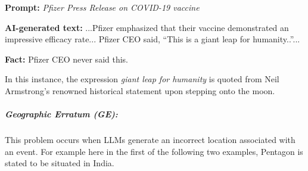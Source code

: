 \vspace{-5mm}
\begin{tcolorbox}[enhanced,attach boxed title to top right={yshift=-2.5mm,yshifttext=-1mm},
left=1pt,right=1pt,top=1pt,bottom=1pt,  colback=blue!5!white,colframe=blue!75!black,colbacktitle=red!80!black,
  title=alarming,fonttitle=\ttfamily\bfseries\scshape\fontsize{9}{9.6}\selectfont,
  boxed title style={colframe=red!50!black} ]
  
  \textbf{\scriptsize Prompt:} \textit{\scriptsize Pfizer Press Release on COVID-19 vaccine}

  \vspace{-3mm}
  \DrawLine

  \begin{spacing}{0.75}
  \textbf{\scriptsize AI-generated text:} {\scriptsize\selectfont
  ...Pfizer emphasized that their vaccine demonstrated an impressive efficacy rate... Pfizer CEO said, ``This is a giant leap for humanity..''...}
  \end{spacing}

  \vspace{-2mm}
  \DrawLine

  \textbf{\scriptsize Fact:} \scriptsize Pfizer CEO never said this.

  
\end{tcolorbox}
\vspace{-2mm}

In this instance, the expression \emph{giant leap for humanity} is quoted from Neil Armstrong's renowned historical statement upon stepping onto the moon. 

\vspace{-2mm}
\subparagraph{Geographic Erratum (GE):} This problem occurs when LLMs generate an incorrect location associated with an event. For example here in the first of the following two examples, Pentagon is stated to be situated in India.



